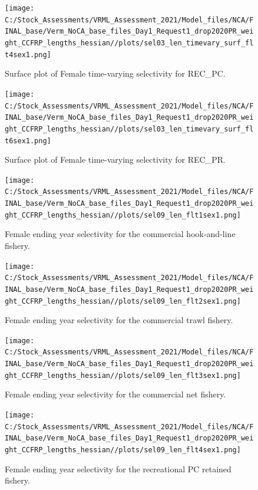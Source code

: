 \documentclass[
  english,
  a4paper,
]{article}
\begin{document}
\FloatBarrier

\begin{figure}
\centering
\texttt{[image: C:/Stock\_Assessments/VRML\_Assessment\_2021/Model\_files/NCA/FINAL\_base/Verm\_NoCA\_base\_files\_Day1\_Request1\_drop2020PR\_weight\_CCFRP\_lengths\_hessian//plots/sel03\_len\_timevary\_surf\_flt4sex1.png]}
\caption{Surface plot of Female time-varying selectivity for REC\_PC.\label{fig:sel03_len_timevary_surf_flt4sex1}}
\end{figure}

\begin{figure}
\centering
\texttt{[image: C:/Stock\_Assessments/VRML\_Assessment\_2021/Model\_files/NCA/FINAL\_base/Verm\_NoCA\_base\_files\_Day1\_Request1\_drop2020PR\_weight\_CCFRP\_lengths\_hessian//plots/sel03\_len\_timevary\_surf\_flt6sex1.png]}
\caption{Surface plot of Female time-varying selectivity for REC\_PR.\label{fig:sel03_len_timevary_surf_flt6sex1}}
\end{figure}

\FloatBarrier

\FloatBarrier

\begin{figure}
\centering
\texttt{[image: C:/Stock\_Assessments/VRML\_Assessment\_2021/Model\_files/NCA/FINAL\_base/Verm\_NoCA\_base\_files\_Day1\_Request1\_drop2020PR\_weight\_CCFRP\_lengths\_hessian//plots/sel09\_len\_flt1sex1.png]}
\caption{Female ending year selectivity for the commercial hook-and-line fishery.\label{fig:endyr-selex-COM-HKL}}
\end{figure}

\begin{figure}
\centering
\texttt{[image: C:/Stock\_Assessments/VRML\_Assessment\_2021/Model\_files/NCA/FINAL\_base/Verm\_NoCA\_base\_files\_Day1\_Request1\_drop2020PR\_weight\_CCFRP\_lengths\_hessian//plots/sel09\_len\_flt2sex1.png]}
\caption{Female ending year selectivity for the commercial trawl fishery.\label{fig:endyr-selex-COM-TWL}}
\end{figure}

\begin{figure}
\centering
\texttt{[image: C:/Stock\_Assessments/VRML\_Assessment\_2021/Model\_files/NCA/FINAL\_base/Verm\_NoCA\_base\_files\_Day1\_Request1\_drop2020PR\_weight\_CCFRP\_lengths\_hessian//plots/sel09\_len\_flt3sex1.png]}
\caption{Female ending year selectivity for the commercial net fishery.\label{fig:endyr-selex-COM-NET}}
\end{figure}

\begin{figure}
\centering
\texttt{[image: C:/Stock\_Assessments/VRML\_Assessment\_2021/Model\_files/NCA/FINAL\_base/Verm\_NoCA\_base\_files\_Day1\_Request1\_drop2020PR\_weight\_CCFRP\_lengths\_hessian//plots/sel09\_len\_flt4sex1.png]}
\caption{Female ending year selectivity for the recreational PC retained fishery.\label{fig:endyr-selex-REC-PC}}
\end{figure}
\end{document}
